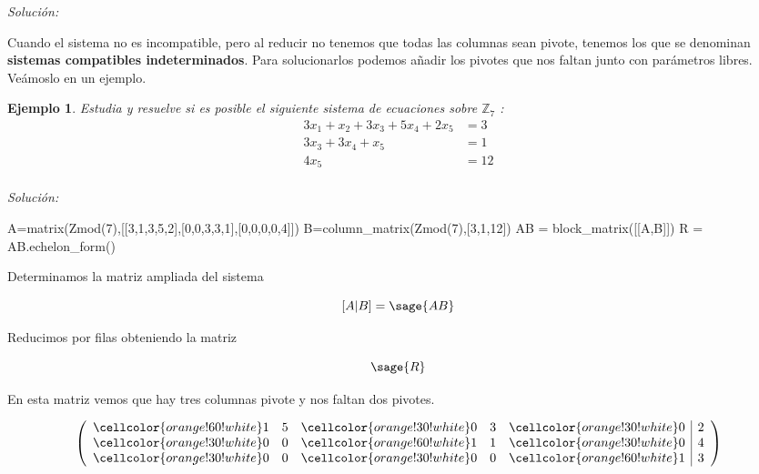 \documentclass{amsart}
\newtheorem{ejem}{Ejemplo}
\def\z{\mathbb{Z}}
\begin{document}
{\it Soluci\'on:}


\vspace{1cm}

Cuando el sistema no es incompatible, pero al reducir no tenemos que 
todas las columnas sean pivote, tenemos los que se denominan 
{\bf sistemas compatibles indeterminados}. Para solucionarlos podemos añadir
los pivotes que nos faltan junto con parámetros libres. Veámoslo en 
un ejemplo. 

\begin{ejem} Estudia y resuelve si es posible el siguiente sistema de ecuaciones sobre $\z _7$ :
\begin{align*}
3x_{1} + x_{2} + 3x_{3} + 5x_{4} + 2x_{5} &= 3 \\
3x_{3} + 3x_{4} + x_{5} &= 1 \\
4x_{5} &= 12 \\
\end{align*}
\end{ejem}

{\it Solución:}


\begin{sageblock}
A=matrix(Zmod(7),[[3,1,3,5,2],[0,0,3,3,1],[0,0,0,0,4]])
B=column_matrix(Zmod(7),[3,1,12])
AB = block_matrix([[A,B]])
R = AB.echelon_form()
\end{sageblock}

Determinamos la matriz ampliada del sistema 

\[[A|B] = \sage{AB} \]

Reducimos por filas obteniendo la matriz

\[ \sage{R} \]

En esta matriz vemos que hay tres columnas pivote y nos faltan dos pivotes. 

\[
\left(\begin{array}{rrrrr|r}
\cellcolor{orange!60!white} 1 & 5 & \cellcolor{orange!30!white} 0 & 3 & \cellcolor{orange!30!white} 0 & 2 \\
\cellcolor{orange!30!white} 0 & 0 & \cellcolor{orange!60!white} 1 & 1 & \cellcolor{orange!30!white} 0 & 4 \\
\cellcolor{orange!30!white} 0 & 0 & \cellcolor{orange!30!white} 0 & 0 & \cellcolor{orange!60!white} 1 & 3
\end{array}\right)
\]
\end{document}
